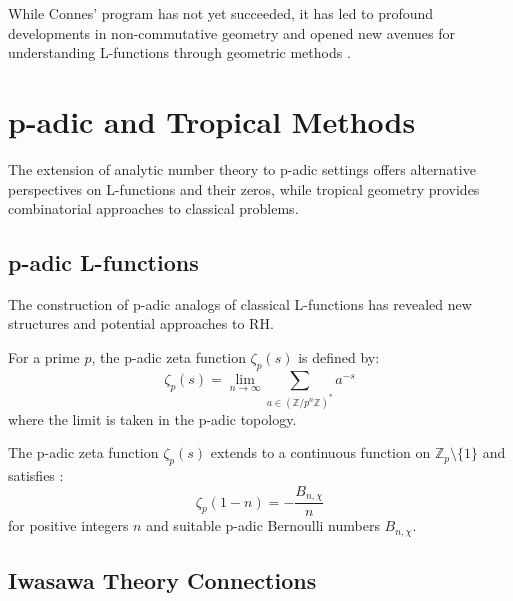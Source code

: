 \begin{remark}
While Connes' program has not yet succeeded, it has led to profound developments in non-commutative geometry and opened new avenues for understanding L-functions through geometric methods \cite{connes1999}.
\end{remark}

\section{p-adic and Tropical Methods}
\label{sec:padic_tropical}

The extension of analytic number theory to p-adic settings offers alternative perspectives on L-functions and their zeros, while tropical geometry provides combinatorial approaches to classical problems.

\subsection{p-adic L-functions}

The construction of p-adic analogs of classical L-functions has revealed new structures and potential approaches to RH.

\begin{definition}
\label{def:padic_zeta}
For a prime $p$, the p-adic zeta function $\zeta_p(s)$ is defined by:
\begin{equation}
\zeta_p(s) = \lim_{n \to \infty} \sum_{a \in (\mathbb{Z}/p^n\mathbb{Z})^*} a^{-s}
\label{eq:padic_zeta}
\end{equation}
where the limit is taken in the p-adic topology.
\end{definition}

\begin{theorem}
\label{thm:kubota_leopoldt}
The p-adic zeta function $\zeta_p(s)$ extends to a continuous function on $\mathbb{Z}_p \setminus \{1\}$ and satisfies \cite{iwanieckowalski2004}:
\begin{equation}
\zeta_p(1-n) = -\frac{B_{n,\chi}}{n}
\label{eq:kubota_leopoldt}
\end{equation}
for positive integers $n$ and suitable p-adic Bernoulli numbers $B_{n,\chi}$.
\end{theorem}

\subsection{Iwasawa Theory Connections}

